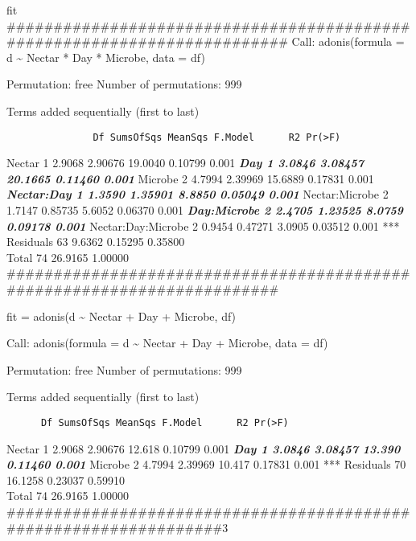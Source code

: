 \documentclass[]{article}
\begin{document}
fit
\#\#\#\#\#\#\#\#\#\#\#\#\#\#\#\#\#\#\#\#\#\#\#\#\#\#\#\#\#\#\#\#\#\#\#\#\#\#\#\#\#\#\#\#\#\#\#\#\#\#\#\#\#\#\#\#\#\#\#\#\#\#\#\#\#\#\#\#\#\#\#\#\#
Call: adonis(formula = d \textasciitilde{} Nectar * Day * Microbe, data
= df)

Permutation: free Number of permutations: 999

Terms added sequentially (first to last)

\begin{verbatim}
               Df SumsOfSqs MeanSqs F.Model      R2 Pr(>F)    
\end{verbatim}

Nectar 1 2.9068 2.90676 19.0040 0.10799 0.001 \textbf{\emph{ Day 1
3.0846 3.08457 20.1665 0.11460 0.001 }} Microbe 2 4.7994 2.39969 15.6889
0.17831 0.001 \textbf{\emph{ Nectar:Day 1 1.3590 1.35901 8.8850 0.05049
0.001 }} Nectar:Microbe 2 1.7147 0.85735 5.6052 0.06370 0.001
\textbf{\emph{ Day:Microbe 2 2.4705 1.23525 8.0759 0.09178 0.001 }}
Nectar:Day:Microbe 2 0.9454 0.47271 3.0905 0.03512 0.001 *** Residuals
63 9.6362 0.15295 0.35800\\
Total 74 26.9165 1.00000\\
\#\#\#\#\#\#\#\#\#\#\#\#\#\#\#\#\#\#\#\#\#\#\#\#\#\#\#\#\#\#\#\#\#\#\#\#\#\#\#\#\#\#\#\#\#\#\#\#\#\#\#\#\#\#\#\#\#\#\#\#\#\#\#\#\#\#\#\#\#\#\#\#

fit = adonis(d \textasciitilde{} Nectar + Day + Microbe, df)

Call: adonis(formula = d \textasciitilde{} Nectar + Day + Microbe, data
= df)

Permutation: free Number of permutations: 999

Terms added sequentially (first to last)

\begin{verbatim}
      Df SumsOfSqs MeanSqs F.Model      R2 Pr(>F)    
\end{verbatim}

Nectar 1 2.9068 2.90676 12.618 0.10799 0.001 \textbf{\emph{ Day 1 3.0846
3.08457 13.390 0.11460 0.001 }} Microbe 2 4.7994 2.39969 10.417 0.17831
0.001 *** Residuals 70 16.1258 0.23037 0.59910\\
Total 74 26.9165 1.00000\\
\#\#\#\#\#\#\#\#\#\#\#\#\#\#\#\#\#\#\#\#\#\#\#\#\#\#\#\#\#\#\#\#\#\#\#\#\#\#\#\#\#\#\#\#\#\#\#\#\#\#\#\#\#\#\#\#\#\#\#\#\#\#\#\#\#\#3

\subsubsection{}\label{section-7}
\end{document}

